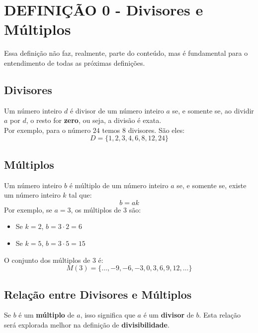 \section{DEFINIÇÃO 0 - Divisores e Múltiplos}
Essa definição não faz, realmente, parte do conteúdo, mas é fundamental para o entendimento de todas as próximas definições.
\subsection{Divisores}
Um número inteiro $d$ é divisor de um número inteiro $a$ se, e somente se, ao dividir $a$ por $d$, o resto for \textbf{zero}, ou seja, a divisão é exata.\\
Por exemplo, para o número $24$ temos $8$ divisores. São eles:\\
\[
    D = \{1,2,3,4,6,8,12,24\}
\]
\subsection{Múltiplos}
Um número inteiro $b$ é múltiplo de um número inteiro $a$ se, e somente se, existe um número inteiro $k$ tal que:
\[
    b = ak
\]
Por exemplo, se $a = 3$, os múltiplos de 3 são:
\begin{itemize}
    \item Se $k = 2$, $b = 3 \cdot 2 = 6$
    \item Se $k = 5$, $b = 3 \cdot 5 = 15$
\end{itemize}
O conjunto dos múltiplos de $3$ é:
\[
    M(3) = \{\dots, -9, -6, -3, 0, 3, 6, 9, 12, \dots\}
\]
\subsection{Relação entre Divisores e Múltiplos}
Se $b$ é um \textbf{múltiplo} de $a$, isso significa que $a$ é um \textbf{divisor} de $b$. Esta relação será explorada melhor na definição de \textbf{divisibilidade}.